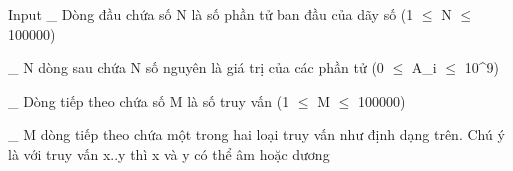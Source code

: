 Input
\_ Dòng đầu chứa số N là số phần tử ban đầu của dãy số (1 $\le$ N $\le$ 100000)   


   \_ N dòng sau chứa N số nguyên là giá trị của các phần tử (0 $\le$ A\_i $\le$ 10^9)   


   \_ Dòng tiếp theo chứa số M là số truy vấn (1 $\le$ M $\le$ 100000)   


   \_ M dòng tiếp theo chứa một trong hai loại truy vấn như định dạng trên. Chú ý là với truy vấn x..y thì x và y có thể âm hoặc dương